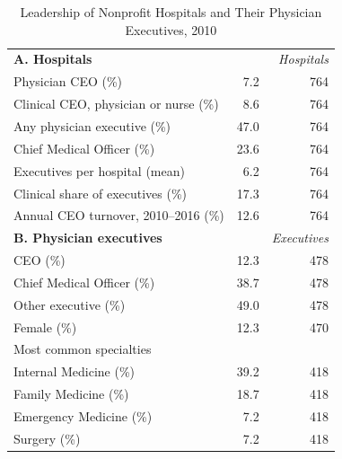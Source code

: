 \begin{table}

\caption{\label{tab:desc_leadership}Leadership of Nonprofit Hospitals and Their Physician Executives, 2010}
\centering
\begin{threeparttable}
\begin{tabular}[t]{lrr}
\toprule
\textbf{A. Hospitals} &  & \textit{Hospitals}\\
\hspace{1em}Physician CEO (\%) & 7.2 & 764\\
\hspace{1em}Clinical CEO, physician or nurse (\%) & 8.6 & 764\\
\hspace{1em}Any physician executive (\%) & 47.0 & 764\\
\hspace{1em}Chief Medical Officer (\%) & 23.6 & 764\\
\hspace{1em}Executives per hospital (mean) & 6.2 & 764\\
\hspace{1em}Clinical share of executives (\%) & 17.3 & 764\\
\hspace{1em}Annual CEO turnover, 2010--2016 (\%) & 12.6 & 764\\
\addlinespace
\textbf{B. Physician executives} &  & \textit{Executives}\\
\hspace{1em}CEO (\%) & 12.3 & 478\\
\hspace{1em}Chief Medical Officer (\%) & 38.7 & 478\\
\hspace{1em}Other executive (\%) & 49.0 & 478\\
\hspace{1em}Female (\%) & 12.3 & 470\\
\hspace{1em}Most common specialties &  & \\
\hspace{2em}Internal Medicine (\%) & 39.2 & 418\\
\hspace{2em}Family Medicine (\%) & 18.7 & 418\\
\hspace{2em}Emergency Medicine (\%) & 7.2 & 418\\
\hspace{2em}Surgery (\%) & 7.2 & 418\\

\end{tabular}
\end{threeparttable}
\end{table}
